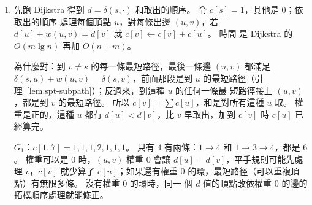 \begin{enumerate}
\item 先跑 Dijkstra 得到 $d = \delta(s, \cdot)$ 和取出的順序。 令 $c[s] = 1$，其他是 $0$；依取出的順序
處理每個頂點 $u$，對每條出邊 $(u, v)$，若 $d[u] + w(u, v) = d[v]$ 就 $c[v] \gets c[v] + c[u]$。 時間
是 Dijkstra 的 $O(m \lg n)$ 再加 $O(n + m)$。

為什麼對：到 $v \ne s$ 的每一條最短路徑，最後一條邊 $(u, v)$ 都滿足 $\delta(s, u) + w(u, v) = \delta(s,
v)$，前面那段是到 $u$ 的最短路徑（引理~\ref{lem:spt-subpath}）；反過來，到這種 $u$ 的任何一條最
短路徑接上 $(u, v)$，都是到 $v$ 的最短路徑。 所以 $c[v] = \sum c[u]$，和是對所有這種 $u$ 取。 權
重是正的，這種 $u$ 都有 $d[u] < d[v]$，比 $v$ 早取出，加到 $c[v]$ 時 $c[u]$ 已經算完。

$G_1$：$c[1..7] = 1, 1, 1, 2, 1, 1, 1$。 只有 $4$ 有兩條：$1 \to 4$ 和 $1 \to 3 \to 4$，都是 $6$。
權重可以是 $0$ 時，$(u, v)$ 權重 $0$ 會讓 $d[u] = d[v]$，平手規則可能先處理 $v$，$c[v]$ 就少算了
$c[u]$；如果還有權重 $0$ 的環，最短路徑（可以重複頂點）有無限多條。 沒有權重 $0$ 的環時，同一
個 $d$ 值的頂點改依權重 $0$ 的邊的拓樸順序處理就能修正。


\end{enumerate}
